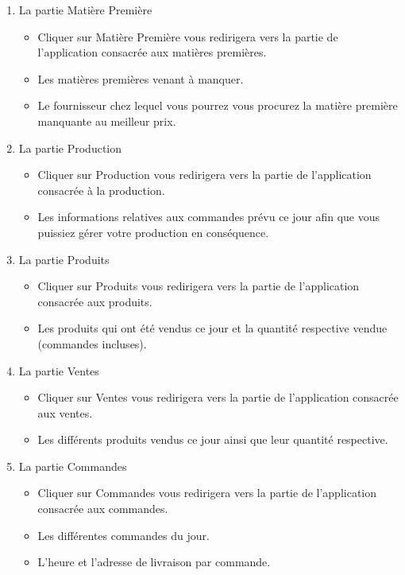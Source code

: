\begin{enumerate}
    \item La partie Matière Première
    \begin{itemize}
        \item Cliquer sur Matière Première vous redirigera vers la partie de
            l'application consacrée aux matières premières.
        \item Les matières premières venant à manquer.
        \item Le fournisseur chez lequel vous pourrez vous procurez la matière
            première manquante au meilleur prix.
    \end{itemize}
    \item La partie Production
    \begin{itemize}
        \item Cliquer sur Production vous redirigera vers la partie de
            l'application consacrée à la production.
        \item Les informations relatives aux commandes prévu ce jour afin que
            vous puissiez gérer votre production en conséquence.
    \end{itemize}
    \item La partie Produits
    \begin{itemize}
        \item Cliquer sur Produits vous redirigera vers la partie de
            l'application consacrée aux produits.
        \item Les produits qui ont été vendus ce jour et la quantité respective
            vendue (commandes incluses).
    \end{itemize}
    \item La partie Ventes
    \begin{itemize}
        \item Cliquer sur Ventes vous redirigera vers la partie de
            l'application consacrée aux ventes.
        \item Les différents produits vendus ce jour ainsi que leur quantité
            respective.
    \end{itemize}
    \item La partie Commandes
    \begin{itemize}
        \item Cliquer sur Commandes vous redirigera vers la partie de
            l'application consacrée aux commandes.
        \item Les différentes commandes du jour.
        \item L'heure et l'adresse de livraison par commande.
    \end{itemize}
\end{enumerate}


